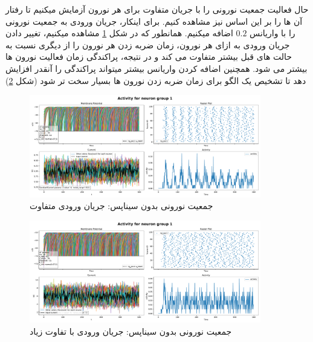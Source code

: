 \documentclass{report}
\begin{document}
        حال فعالیت جمعیت نورونی را با جریان متفاوت برای هر نورون آزمایش میکنیم تا رفتار آن ها را بر این اساس نیز مشاهده کنیم. برای اینکار، جریان ورودی به جمعیت نورونی را با واریانس 
        $0.2$
        اضافه میکنیم. همانطور که در شکل 
        \ref{fig:part1-simple-ng-variance-curr}
        مشاهده میکنیم، تغییر دادن جریان ورودی به ازای هر نورون، زمان ضربه زدن هر نورون را از دیگری نسبت به حالت های قبل بیشتر متفاوت می کند و در نتیجه، پراکندگی زمان فعالیت نورون ها بیشتر می شود. همچنین اضافه کردن واریانس بیشتر میتواند پراکندگی را آنقدر افزایش دهد تا تشخیص یک الگو برای زمان ضربه زدن نورون ها بسیار سخت تر شود
        (شکل \ref{fig:part1-simple-ng-high-variance-curr})
        \begin{figure}[!ht]
            \centering
            \includegraphics[width=0.9\textwidth]{plots/part1-Simple-ng-without-synapse-variance-curr.pdf} 
            \caption{جمعیت نورونی بدون سیناپس: جریان ورودی متفاوت}
            \label{fig:part1-simple-ng-variance-curr}
        \end{figure}
        \begin{figure}[!ht]
            \centering
            \includegraphics[width=0.9\textwidth]{plots/part1-Simple-ng-without-synapse-high-variance-curr.pdf} 
            \caption{جمعیت نورونی بدون سیناپس: جریان ورودی با تفاوت زیاد}
            \label{fig:part1-simple-ng-high-variance-curr}
        \end{figure}
\end{document}
